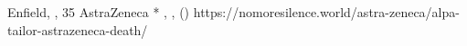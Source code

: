           {Enfield, , }
          {35}
          {AstraZeneca}
          {*}
          {
            ,
            ,
             ()
          }
          {https://nomoresilence.world/astra-zeneca/alpa-tailor-astrazeneca-death/}

